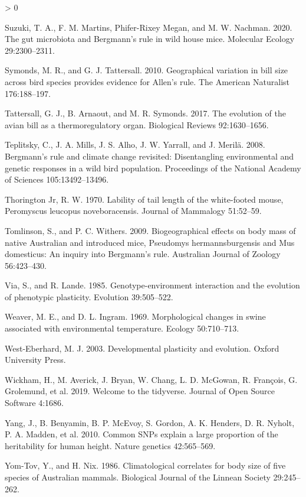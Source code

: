 \documentclass[
]{article}
\newlength{\cslhangindent}
\newenvironment{CSLReferences}[2] %
 {%
  \setlength{\parindent}{0pt}
  \ifodd #1 \everypar{\setlength{\hangindent}{\cslhangindent}}\ignorespaces\fi
  \ifnum #2 > 0
  \setlength{\parskip}{#2\baselineskip}
  \fi
 }%
 {}
\begin{document}
\begin{CSLReferences}{0}{0}
\leavevmode\hypertarget{ref-Suzuki2020}{}%
Suzuki, T. A., F. M. Martins, Phifer-Rixey Megan, and M. W. Nachman.
2020. The gut microbiota and {Bergmann's} rule in wild house mice.
Molecular Ecology 29:2300--2311.

\leavevmode\hypertarget{ref-Symonds2010}{}%
Symonds, M. R., and G. J. Tattersall. 2010. Geographical variation in
bill size across bird species provides evidence for {Allen's} rule. The
American Naturalist 176:188--197.

\leavevmode\hypertarget{ref-Tattersall2017}{}%
Tattersall, G. J., B. Arnaout, and M. R. Symonds. 2017. The evolution of
the avian bill as a thermoregulatory organ. Biological Reviews
92:1630--1656.

\leavevmode\hypertarget{ref-Teplitsky2008}{}%
Teplitsky, C., J. A. Mills, J. S. Alho, J. W. Yarrall, and J. Merilä.
2008. Bergmann's rule and climate change revisited: Disentangling
environmental and genetic responses in a wild bird population.
Proceedings of the National Academy of Sciences 105:13492--13496.

\leavevmode\hypertarget{ref-Thorington1970}{}%
Thorington Jr, R. W. 1970. Lability of tail length of the white-footed
mouse, {Peromyscus} leucopus noveboracensis. Journal of Mammalogy
51:52--59.

\leavevmode\hypertarget{ref-Tomlinson2009}{}%
Tomlinson, S., and P. C. Withers. 2009. Biogeographical effects on body
mass of native {Australian} and introduced mice, {Pseudomys}
hermannsburgensis and {Mus} domesticus: An inquiry into {Bergmann's}
rule. Australian Journal of Zoology 56:423--430.

\leavevmode\hypertarget{ref-Via1985}{}%
Via, S., and R. Lande. 1985. Genotype-environment interaction and the
evolution of phenotypic plasticity. Evolution 39:505--522.

\leavevmode\hypertarget{ref-Weaver1969}{}%
Weaver, M. E., and D. L. Ingram. 1969. Morphological changes in swine
associated with environmental temperature. Ecology 50:710--713.

\leavevmode\hypertarget{ref-West-Eberhard2003}{}%
West-Eberhard, M. J. 2003. Developmental plasticity and evolution.
Oxford University Press.

\leavevmode\hypertarget{ref-Wickham2019}{}%
Wickham, H., M. Averick, J. Bryan, W. Chang, L. D. McGowan, R. François,
G. Grolemund, et al. 2019. Welcome to the {tidyverse}. Journal of Open
Source Software 4:1686.

\leavevmode\hypertarget{ref-Yang2010}{}%
Yang, J., B. Benyamin, B. P. McEvoy, S. Gordon, A. K. Henders, D. R.
Nyholt, P. A. Madden, et al. 2010. Common SNPs explain a large
proportion of the heritability for human height. Nature genetics
42:565--569.

\leavevmode\hypertarget{ref-Yom-Tov1986}{}%
Yom-Tov, Y., and H. Nix. 1986. Climatological correlates for body size
of five species of {Australian} mammals. Biological Journal of the
Linnean Society 29:245--262.

\end{CSLReferences}
\end{document}
